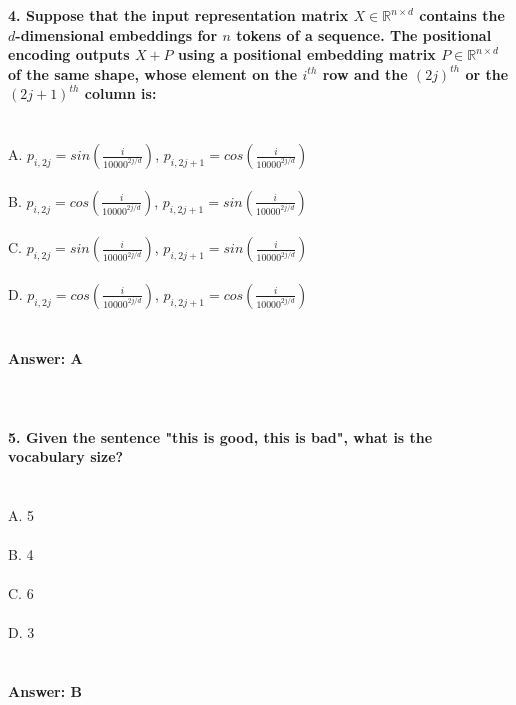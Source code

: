 \documentclass[prl,twocolumn,showpacs,preprintnumbers,superscriptaddress]{revtex4}
\theoremstyle{plain}
\theoremstyle{definition}
\begin{document}
\begin{widetext}
\textbf{4. Suppose that the input representation matrix $X \in \mathbb{R}^{n \times d}$  contains the  $d$-dimensional embeddings for  $n$  tokens of a sequence. The positional encoding outputs  $X + P$  using a positional embedding matrix  $P \in \mathbb{R}^{n \times d}$  of the same shape, whose element on the  $i^{th}$  row and the  $(2j)^{th}$  or the  $(2j+1)^{th}$  column is:}
\\
\\
\\
A. $p_{i, 2j} = sin(\frac{i}{10000^{2j/d}})$, $p_{i, 2{j+1}} = cos(\frac{i}{10000^{2j/d}})$
\\
\\
B. $p_{i, 2j} = cos(\frac{i}{10000^{2j/d}})$, $p_{i, 2{j+1}} = sin(\frac{i}{10000^{2j/d}})$
\\
\\
C. $p_{i, 2j} = sin(\frac{i}{10000^{2j/d}})$, $p_{i, 2{j+1}} = sin(\frac{i}{10000^{2j/d}})$
\\
\\
D. $p_{i, 2j} = cos(\frac{i}{10000^{2j/d}})$, $p_{i, 2{j+1}} = cos(\frac{i}{10000^{2j/d}})$
\\
\\
\\
\textbf{Answer: A}
\\
\\
\\
\\
\textbf{5. Given the sentence "this is good, this is bad", what is the vocabulary size?}
\\
\\
\\
A. 5
\\
\\
B. 4
\\
\\
C. 6
\\
\\
D. 3
\\
\\
\\
\textbf{Answer: B}
\\
\\
\\
\\
\\
\\
\end{widetext}
\end{document}
